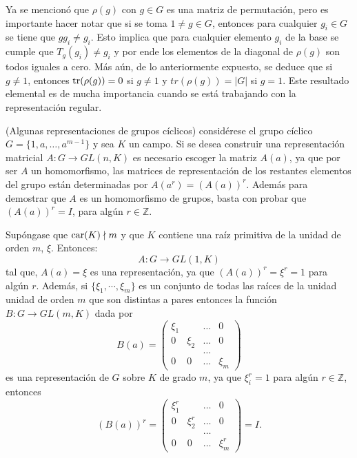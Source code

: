 \begin{nota}
Ya se mencionó que $\rho(g)$ con $g \in G$ es una matriz de permutación, pero es importante hacer notar que si se toma $ 1 \neq g \in G$, entonces para cualquier $g_i \in G$ se tiene que $ gg_i \neq g_i $. Esto implica que para cualquier elemento $g_i$ de la base se cumple que $T_g(g_i) \neq g_i$ y por ende los elementos de la diagonal de $\rho(g)$ son todos iguales a cero. Más aún, de lo anteriormente expuesto, se deduce que si $g \neq 1$, entonces $\operatorname{tr}(\rho(g)) = 0$ si $g \neq 1$ y $tr(\rho(g)) = |G|$ si $g = 1$. Este resultado elemental es de mucha importancia cuando se está trabajando con la representación regular.
\end{nota}
\begin{ejemplo}\label{rciclica}(Algunas representaciones de grupos cíclicos)
considérese el grupo cíclico $G = \{1,a, \dots, a^{m-1} \}$ y sea $K$ un campo. Si se desea construir una representación matricial $A \colon G \to GL(n,K)$ es necesario escoger la matriz $A(a)$, ya que por ser $A$ un homomorfismo, las matrices de representación de los restantes elementos del grupo están determinadas por $A(a^r) = (A(a))^r $. Además para demostrar que $A$ es un homomorfismo de grupos, basta con probar que $(A(a))^r = I$, para algún $r \in \mathds{Z}$.

Supóngase que $\operatorname{car}(K) \nmid m$ y que $K$ contiene una raíz primitiva de la unidad de orden $m$,  $\xi$. Entonces: 
\begin{equation*} A \colon G \to GL(1,K) \end{equation*}  tal que, $A(a)  = \xi$ es una representación, ya que $(A(a))^r = \xi^r = 1$ para algún $r$.  Además, si $\{ \xi_1, \cdots, \xi_m \}$ es un conjunto de todas las raíces de la unidad unidad de orden $m$ que son distintas a pares entonces la función $B \colon G \to GL(m,K)$ dada por 
\begin{equation*} B(a) = \begin{pmatrix}
\xi_1 &  &\dots &  0 \\
0 & \xi_2 & \dots & 0 \\
 & & \dots &  \\
 0 & 0 & \dots & \xi_m
\end{pmatrix} \end{equation*} es una representación de $G$ sobre $K$ de grado $m$, ya que $\xi_i^r = 1$ para algún $r \in \mathds{Z}$, entonces 
\begin{equation*} (B(a))^r = \begin{pmatrix}
\xi_1^r &  &\dots &  0 \\
0 & \xi_2^r & \dots & 0 \\
 & & \dots &  \\
 0 & 0 & \dots & \xi_m^r
\end{pmatrix} = I. \end{equation*}


\end{ejemplo}
